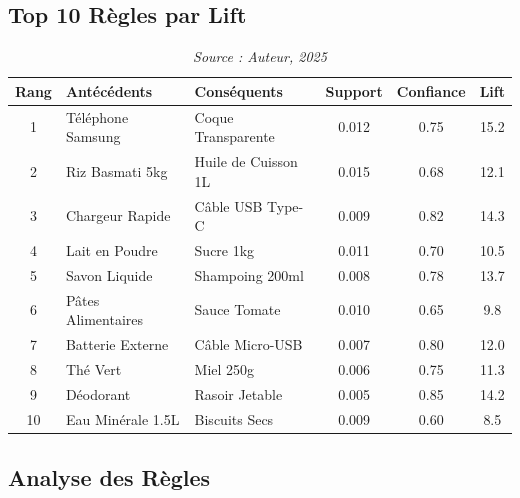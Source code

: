\documentclass[a4paper,12pt]{article}
\begin{document}
\subsection{Top 10 Règles par Lift}
\begin{table}[H]
\centering
\begin{tabular}{|c|p{3.5cm}|p{3.5cm}|c|c|c|}
\hline
\textbf{Rang} & \textbf{Antécédents} & \textbf{Conséquents} & \textbf{Support} & \textbf{Confiance} & \textbf{Lift} \\
\hline
1 & Téléphone Samsung & Coque Transparente & 0.012 & 0.75 & 15.2 \\
\hline
2 & Riz Basmati 5kg & Huile de Cuisson 1L & 0.015 & 0.68 & 12.1 \\
\hline
3 & Chargeur Rapide & Câble USB Type-C & 0.009 & 0.82 & 14.3 \\
\hline
4 & Lait en Poudre & Sucre 1kg & 0.011 & 0.70 & 10.5 \\
\hline
5 & Savon Liquide & Shampoing 200ml & 0.008 & 0.78 & 13.7 \\
\hline
6 & Pâtes Alimentaires & Sauce Tomate & 0.010 & 0.65 & 9.8 \\
\hline
7 & Batterie Externe & Câble Micro-USB & 0.007 & 0.80 & 12.0 \\
\hline
8 & Thé Vert & Miel 250g & 0.006 & 0.75 & 11.3 \\
\hline
9 & Déodorant & Rasoir Jetable & 0.005 & 0.85 & 14.2 \\
\hline
10 & Eau Minérale 1.5L & Biscuits Secs & 0.009 & 0.60 & 8.5 \\
\hline
\end{tabular}
\caption{Top 10 règles d'association (FP-Growth, support $\geq$ 0.01, confiance $\geq$ 0.5)}
\caption*{\textit{Source : Auteur, 2025}}

\label{tab:top_association_rules}
\end{table}

\subsection{Analyse des Règles}
\end{document}
